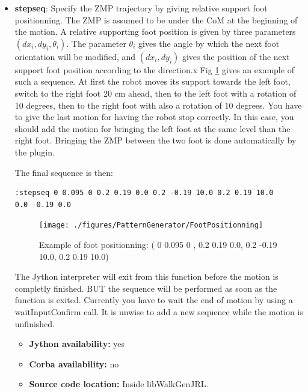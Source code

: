 \begin{itemize}
\item {\bf stepseq}: Specify the ZMP trajectory by giving relative support foot positionning.
The ZMP is assumed to be under the CoM at the beginning of the motion.
A relative supporting foot position is given by three parameters $(dx_i,dy_i,\theta_i)$.
The parameter $\theta_i$ gives the angle by which the next foot orientation will be modified, and $(dx_i,dy_i)$ gives
the position of the next support foot position according to the direction.x
Fig \ref{pic:FootPositionning} gives an example of such a sequence.
At first the robot moves its support towards the left foot, switch to the right foot
20 cm ahead, then to the left foot with a rotation of 10 degrees, then to the right
foot with also a rotation of 10 degrees. You have to give the last motion for having
the robot stop correctly. In this case, you should add the motion for bringing the left foot
at the same level than the right foot. Bringing the ZMP between the two foot is done
automatically by the plugin.

The final sequence is then:
\begin{verbatim}
:stepseq 0 0.095 0 0.2 0.19 0.0 0.2 -0.19 10.0 0.2 0.19 10.0
0.0 -0.19 0.0
\end{verbatim}
\begin{figure}[htb]
\begin{center}
\texttt{[image: ./figures/PatternGenerator/FootPositionning]}
\caption{Example of foot positionning: ( 0 0.095 0 , 0.2 0.19 0.0, 0.2 -0.19 10.0, 0.2 0.19 10.0) }
\label{pic:FootPositionning}
\end{center}
\end{figure}
The Jython interpreter will exit from this function before the motion
is completly finished. BUT the sequence will be performed as soon as
the function is exited.
Currently you have to wait the end of motion
by using a waitInputConfirm call.
It is unwise to add a new sequence while the motion is unfinished.

\begin{itemize}
\item \textbf{Jython availability:} yes
\item \textbf{Corba availability:} no
\item \textbf{Source code location:} Inside libWalkGenJRL.
\end{itemize}


\end{itemize}
